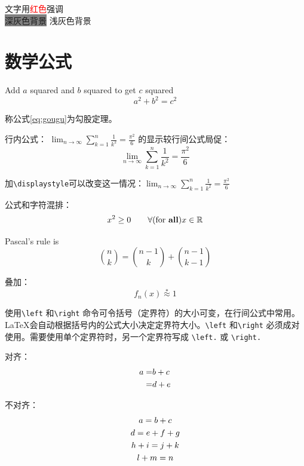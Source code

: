 \documentclass[a4paper]{article} %
\numberwithin{equation}{section} %
\begin{document}
\textsf{文字用\textcolor{red}{红色}强调\\
\colorbox{gray}{深灰色背景} 
\colorbox[gray]{0.95}{浅灰色背景} \\
}


\section{数学公式}

Add $a$ squared and $b$ squared to get $c$ squared
\begin{equation}
a^2+b^2=c^2 \label{eq:gougu}
\end{equation}

称公式\eqref{eq:gougu}为勾股定理。

行内公式：
$\lim_{n \to \infty}
\sum_{k=1}^n \frac{1}{k^2}
= \frac{\pi^2}{6}$
的显示较行间公式局促：
\begin{equation*}
\lim_{n \to \infty}
\sum_{k=1}^n \frac{1}{k^2}
= \frac{\pi^2}{6}
\end{equation*}

加\verb|\displaystyle|可以改变这一情况：$\displaystyle \lim_{n \to \infty}
\sum_{k=1}^n \frac{1}{k^2}
= \frac{\pi^2}{6}$

公式和字符混排：
\begin{equation}x^{2} \ge 0 \qquad \forall
\text{(for \textbf{all})}
x\in\mathbb{R}
\end{equation}

Pascal's rule is
\begin{equation}
\binom{n}{k} =\binom{n-1}{k}
+ \binom{n-1}{k-1}
\end{equation}

叠加：
\[
f_n(x) \stackrel{*}{\approx} 1
\]

使用\verb|\left| 和\verb|\right| 命令可令括号（定界符）的大小可变，在行间公式中常用。\LaTeX 会自动根据括号内的公式大小决定定界符大小。\verb|\left| 和\verb|\right| 必须成对使用。需要使用单个定界符时，另一个定界符写成 \verb|\left.| 或 \verb|\right.|

对齐：
\begin{align}
a =& b + c \notag \\
=& d + e
\end{align}

不对齐：
\begin{gather}
a = b + c \\
d = e + f + g \\
h + i = j + k \notag \\
l + m = n
\end{gather}
\end{document}
